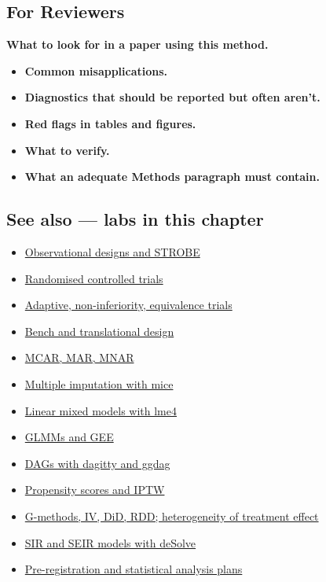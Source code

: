 \documentclass[
]{article}
\providecommand{\tightlist}{%
  \setlength{\itemsep}{0pt}\setlength{\parskip}{0pt}}
\begin{document}
\subsection{For Reviewers}\label{for-reviewers}

\textbf{What to look for in a paper using this method.}

\begin{itemize}
\tightlist
\item
  \textbf{Common misapplications.}
\item
  \textbf{Diagnostics that should be reported but often aren't.}
\item
  \textbf{Red flags in tables and figures.}
\item
  \textbf{What to verify.}
\item
  \textbf{What an adequate Methods paragraph must contain.}
\end{itemize}

\subsection{See also --- labs in this
chapter}\label{see-also-labs-in-this-chapter}

\begin{itemize}
\tightlist
\item
  \href{labs/lab-observational-designs-and-strobe.Rmd}{Observational
  designs and STROBE}
\item
  \href{labs/lab-randomised-controlled-trials.Rmd}{Randomised controlled
  trials}
\item
  \href{labs/lab-adaptive-non-inferiority-equivalence-trials.Rmd}{Adaptive,
  non-inferiority, equivalence trials}
\item
  \href{labs/lab-bench-and-translational-design.Rmd}{Bench and
  translational design}
\item
  \href{labs/lab-mcar-mar-mnar.Rmd}{MCAR, MAR, MNAR}
\item
  \href{labs/lab-multiple-imputation-with-mice.Rmd}{Multiple imputation
  with mice}
\item
  \href{labs/lab-linear-mixed-models-with-lme4.Rmd}{Linear mixed models
  with lme4}
\item
  \href{labs/lab-glmms-and-gee.Rmd}{GLMMs and GEE}
\item
  \href{labs/lab-dags-with-dagitty-and-ggdag.Rmd}{DAGs with dagitty and
  ggdag}
\item
  \href{labs/lab-propensity-scores-and-iptw.Rmd}{Propensity scores and
  IPTW}
\item
  \href{labs/lab-g-methods-iv-did-rdd-heterogeneity-of-treatment-effect.Rmd}{G-methods,
  IV, DiD, RDD; heterogeneity of treatment effect}
\item
  \href{labs/lab-sir-and-seir-models-with-desolve.Rmd}{SIR and SEIR
  models with deSolve}
\item
  \href{labs/lab-pre-registration-and-statistical-analysis-plans.Rmd}{Pre-registration
  and statistical analysis plans}
\end{itemize}
\end{document}
